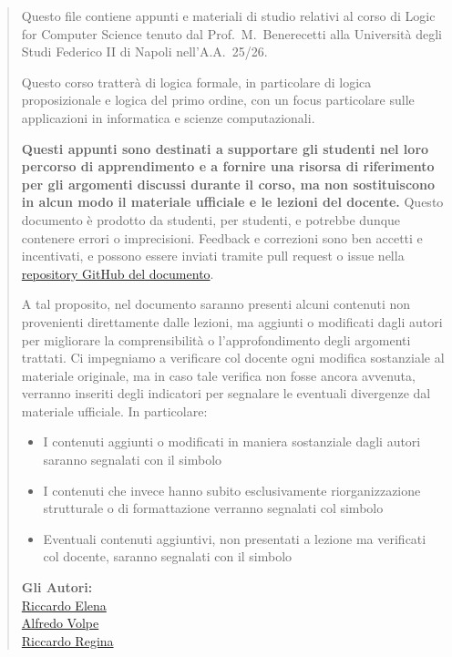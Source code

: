 \begin{abstract}
  Questo file contiene appunti e materiali di studio relativi al corso di Logic for Computer Science tenuto dal Prof.~M.~Benerecetti alla Università degli Studi Federico II di Napoli nell'A.A.~25/26.
  
  Questo corso tratterà di logica formale, in particolare di logica proposizionale e logica del primo ordine, con un focus particolare sulle applicazioni in informatica e scienze computazionali.
  
  \textbf{Questi appunti sono destinati a supportare gli studenti nel loro percorso di apprendimento e a fornire una risorsa di riferimento per gli argomenti discussi durante il corso, ma non sostituiscono in alcun modo il materiale ufficiale e le lezioni del docente.}
  Questo documento è prodotto da studenti, per studenti, e potrebbe dunque contenere errori o imprecisioni. Feedback e correzioni sono ben accetti e incentivati, e possono essere inviati tramite pull request o issue nella \href{https://github.com/RiccardoElena/LOGIC_notes}{repository GitHub del documento}.

  A tal proposito, nel documento saranno presenti alcuni contenuti non provenienti direttamente dalle lezioni, ma aggiunti o modificati dagli autori per migliorare la comprensibilità o l'approfondimento degli argomenti trattati.
  Ci impegniamo a verificare col docente ogni modifica sostanziale al materiale originale, ma in caso tale verifica non fosse ancora avvenuta, verranno inseriti degli indicatori per segnalare le eventuali divergenze dal materiale ufficiale.
  In particolare:
  \begin{itemize}
    \item I contenuti aggiunti o modificati in maniera sostanziale dagli autori saranno segnalati con il simbolo \warningsymbol{}
    \item I contenuti che invece hanno subito esclusivamente riorganizzazione strutturale o di formattazione verranno segnalati col simbolo \infosymbol{}
    \item Eventuali contenuti aggiuntivi, non presentati a lezione ma verificati col docente, saranno segnalati con il simbolo \extrasymbol{}
  \end{itemize}
  
  \begin{flushright}
    \vspace{2cm}
    \textbf{Gli Autori:}\\
    \href{https://github.com/RiccardoElena}{Riccardo Elena}\\
    \href{https://github.com/FredFox3}{Alfredo Volpe}\\
    \href{https://github.com/riccardoregina}{Riccardo Regina}\\
  \end{flushright}
\end{abstract}